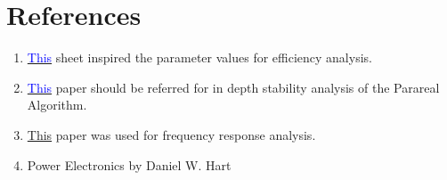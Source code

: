
\chapter{References}

\label{Chapter8} %

\begin{enumerate}
    \item 
\href{https://www.ti.com/lit/an/slva477b/slva477b.pdf?ts=1742274977685&ref_url=https%253A%252F%252Fduckduckgo.com%252F}{\textcolor{blue}{This}} sheet inspired the parameter values for efficiency analysis.
\item \href{https://www.ddm.org/DD15/pdf/127.pdf}{\textcolor{blue}{This}} paper should be referred for in depth stability analysis of the Parareal Algorithm.
\item \href{https://ieeexplore.ieee.org/stamp/stamp.jsp?tp=&arnumber=8210523}{This} paper was used for frequency response analysis.
\item Power Electronics by Daniel W. Hart
\end{enumerate}
